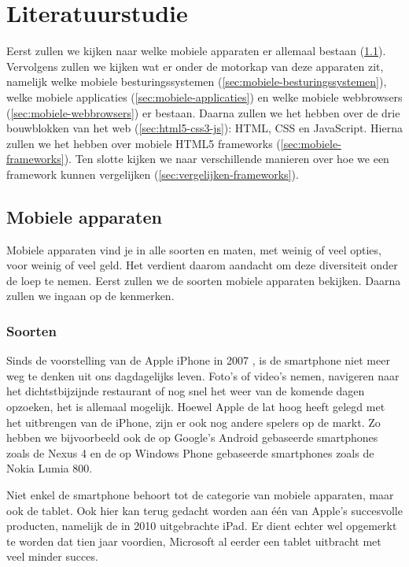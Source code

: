 \chapter{Literatuurstudie}
\label{hoofdstuk:2}
Eerst zullen we kijken naar welke mobiele apparaten er allemaal bestaan (\ref{sec:mobiele-apparaten}). Vervolgens zullen we kijken wat er onder de motorkap van deze apparaten zit, namelijk welke mobiele besturingssystemen (\ref{sec:mobiele-besturingssystemen}), welke mobiele applicaties (\ref{sec:mobiele-applicaties}) en welke mobiele webbrowsers (\ref{sec:mobiele-webbrowsers}) er bestaan. Daarna zullen we het hebben over de drie bouwblokken van het web (\ref{sec:html5-css3-js}):  HTML,  CSS en JavaScript. Hierna zullen we het hebben over mobiele HTML5 frameworks (\ref{sec:mobiele-frameworks}).  Ten slotte kijken we naar verschillende manieren over hoe we een framework kunnen vergelijken (\ref{sec:vergelijken-frameworks}).


\section{Mobiele apparaten}
\label{sec:mobiele-apparaten}
Mobiele apparaten vind je in alle soorten en maten, met weinig of veel opties, voor weinig of veel geld. Het verdient daarom aandacht om deze diversiteit onder de loep te nemen. Eerst zullen we de soorten mobiele apparaten bekijken. Daarna zullen we ingaan op de kenmerken.

\subsection{Soorten}
Sinds de voorstelling van de Apple iPhone in 2007 \cite{David2011}, is de smartphone niet meer weg te denken uit ons dagdagelijks leven. Foto's of video's nemen, navigeren naar het dichtstbijzijnde restaurant of nog snel het weer van de komende dagen opzoeken, het is allemaal mogelijk. Hoewel Apple de lat hoog heeft gelegd met het uitbrengen van de iPhone, zijn er ook nog andere spelers op de markt. Zo hebben we bijvoorbeeld ook de op Google's Android gebaseerde smartphones zoals de Nexus 4 en de op Windows Phone gebaseerde smartphones zoals de Nokia Lumia 800.

Niet enkel de smartphone behoort tot de categorie van mobiele apparaten, maar ook de tablet. Ook hier kan terug gedacht worden aan één van Apple's succesvolle producten, namelijk de in 2010 uitgebrachte iPad. Er dient echter wel opgemerkt te worden dat tien jaar voordien, Microsoft al eerder een tablet uitbracht met veel minder succes.

